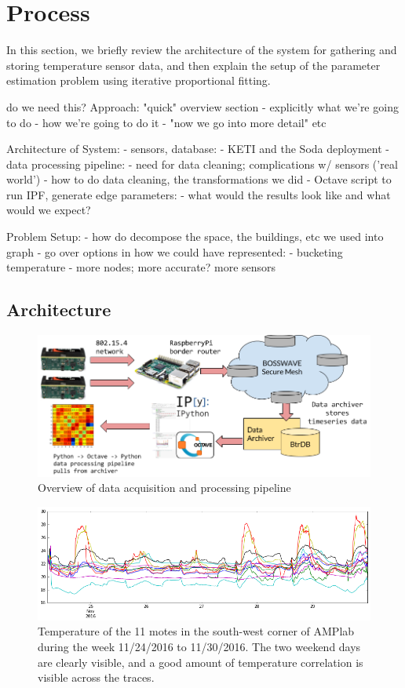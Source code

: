 \section{Process}

In this section, we briefly review the architecture of the system for gathering and storing temperature sensor data, and then explain the setup of the parameter estimation problem using iterative proportional fitting.

do we need this?
Approach: "quick" overview section
- explicitly what we're going to do
- how we're going to do it
- "now we go into more detail" etc

Architecture of System:
- sensors, database:
    - KETI and the Soda deployment
- data processing pipeline:
    - need for data cleaning; complications w/ sensors ('real world')
    - how to do data cleaning, the transformations we did
- Octave script to run IPF, generate edge parameters:
    - what would the results look like and what would we expect?

Problem Setup:
- how do decompose the space, the buildings, etc we used into graph
- go over options in how we could have represented:
    - bucketing temperature
    - more nodes; more accurate? more sensors
\fi



\subsection{Architecture}

\begin{figure}[ht]
\centering
\includegraphics[width=.8\linewidth]{figs/281arch}
\caption{Overview of data acquisition and processing pipeline}
\label{fig:architecture}
\end{figure}

\begin{figure}[ht]
\centering
\includegraphics[width=.8\linewidth]{figs/temperatureplot}
\caption{Temperature of the 11 motes in the south-west corner of AMPlab during the week 11/24/2016 to 11/30/2016. The two weekend days are clearly visible, and a good amount of temperature correlation is visible across the traces.}
\label{fig:temperature}
\end{figure}

